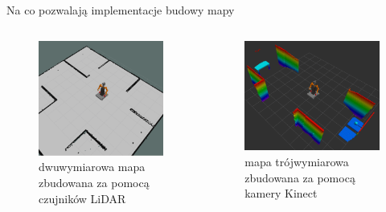 \begin{frame}{Na co pozwalają implementacje budowy mapy}
	\begin{columns}
		\begin{column}{0.5\textwidth}
			\begin{figure}
				\centering
				\includegraphics[height=0.6\textheight]{img/mapa_2d.png}
				\caption{dwuwymiarowa mapa zbudowana za pomocą czujników LiDAR}
			\end{figure}
		\end{column}
		\begin{column}{0.5\textwidth}  %
			\begin{figure}
				\centering
				\includegraphics[height=0.6\textheight]{img/octomapa.png}
				\caption{mapa trójwymiarowa zbudowana za pomocą kamery Kinect}
			\end{figure}
		\end{column}
	\end{columns}
\end{frame}

